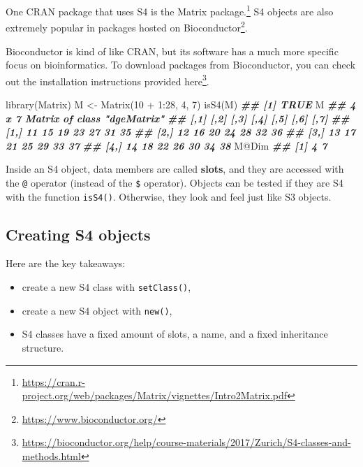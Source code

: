 \documentclass[
  12pt,
  krantz2]{krantz}
\makeatletter
\newenvironment{Shaded}{\begin{snugshade}}{\end{snugshade}}
\newcommand{\DecValTok}[1]{\textcolor[rgb]{0.06,0.06,0.06}{#1}}
\newcommand{\DocumentationTok}[1]{\textcolor[rgb]{0.37,0.37,0.37}{\textbf{\textit{#1}}}}
\newcommand{\FunctionTok}[1]{\textcolor[rgb]{0,0,0}{#1}}
\newcommand{\NormalTok}[1]{#1}
\newcommand{\OtherTok}[1]{\textcolor[rgb]{0.37,0.37,0.37}{#1}}
\newcommand{\SpecialCharTok}[1]{\textcolor[rgb]{0,0,0}{#1}}
\providecommand{\tightlist}{%
  \setlength{\itemsep}{0pt}\setlength{\parskip}{0pt}}
\renewcommand{\href}[2]{#2\footnote{\url{#1}}}
\newenvironment{kframe}{%
\medskip{}
\setlength{\fboxsep}{.8em}
 \def\at@end@of@kframe{}%
 \ifinner\ifhmode%
  \def\at@end@of@kframe{\end{minipage}}%
  \begin{minipage}{\columnwidth}%
 \fi\fi%
 \def\FrameCommand##1{\hskip\@totalleftmargin \hskip-\fboxsep
 \colorbox{shadecolor}{##1}\hskip-\fboxsep
     \hskip-\linewidth \hskip-\@totalleftmargin \hskip\columnwidth}%
 \MakeFramed {\advance\hsize-\width
   \@totalleftmargin\z@ \linewidth\hsize
   \@setminipage}}%
 {\par\unskip\endMakeFramed%
 \at@end@of@kframe}
\renewenvironment{Shaded}{\begin{kframe}}{\end{kframe}}
\makeatother
\begin{document}
One CRAN package that uses S4 is the \href{https://cran.r-project.org/web/packages/Matrix/vignettes/Intro2Matrix.pdf}{Matrix package.} S4 objects are also extremely popular in packages hosted on \href{https://www.bioconductor.org/}{Bioconductor}.

\begin{rmd-details}
Bioconductor is kind of like CRAN, but its software has a much more specific focus on bioinformatics. To download packages from Bioconductor, you can check out the installation instructions provided \href{https://bioconductor.org/help/course-materials/2017/Zurich/S4-classes-and-methods.html}{here}.

\end{rmd-details}

\begin{Shaded}
\begin{Highlighting}[]
\FunctionTok{library}\NormalTok{(Matrix)}
\NormalTok{M }\OtherTok{\textless{}{-}} \FunctionTok{Matrix}\NormalTok{(}\DecValTok{10} \SpecialCharTok{+} \DecValTok{1}\SpecialCharTok{:}\DecValTok{28}\NormalTok{, }\DecValTok{4}\NormalTok{, }\DecValTok{7}\NormalTok{)}
\FunctionTok{isS4}\NormalTok{(M)}
\DocumentationTok{\#\# [1] TRUE}
\NormalTok{M}
\DocumentationTok{\#\# 4 x 7 Matrix of class "dgeMatrix"}
\DocumentationTok{\#\#      [,1] [,2] [,3] [,4] [,5] [,6] [,7]}
\DocumentationTok{\#\# [1,]   11   15   19   23   27   31   35}
\DocumentationTok{\#\# [2,]   12   16   20   24   28   32   36}
\DocumentationTok{\#\# [3,]   13   17   21   25   29   33   37}
\DocumentationTok{\#\# [4,]   14   18   22   26   30   34   38}
\NormalTok{M}\SpecialCharTok{@}\NormalTok{Dim}
\DocumentationTok{\#\# [1] 4 7}
\end{Highlighting}
\end{Shaded}

Inside an S4 object, data members are called \textbf{slots}, and they are accessed with the \texttt{@} operator (instead of the \texttt{\$} operator). Objects can be tested if they are S4 with the function \texttt{isS4()}. Otherwise, they look and feel just like S3 objects.

\hypertarget{creating-s4-objects}{%
\subsection{Creating S4 objects}\label{creating-s4-objects}}

Here are the key takeaways:

\begin{itemize}
\tightlist
\item
  create a new S4 class with \texttt{setClass()},
\item
  create a new S4 object with \texttt{new()},
\item
  S4 classes have a fixed amount of slots, a name, and a fixed inheritance structure.
\end{itemize}
\end{document}
